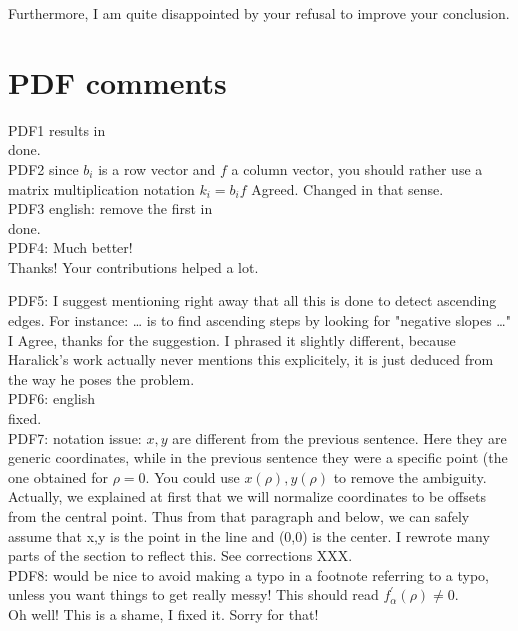 \documentclass[a4paper,10pt]{report}
\begin{document}
\que Furthermore, I am quite disappointed by your refusal to improve your
conclusion.\\

\section{PDF comments}

\que PDF1 results in\\
\ans done.\\

\que PDF2  since $b_i$ is a row vector and $f$ a column vector, you should rather use a matrix multiplication notation
$k_i=b_i f$
\ans Agreed. Changed in that sense.\\

\que PDF3 english: remove the first in\\
\ans done.\\

\que PDF4: Much better!\\
\ans Thanks! Your contributions helped a lot.

\que PDF5: I suggest mentioning right away that all this is done to detect ascending edges. For instance: … is to find ascending steps by looking for "negative slopes …"\\
\ans I Agree, thanks for the suggestion. I phrased it slightly different, because Haralick's work actually never mentions this explicitely, it is just deduced from the way he poses the problem.\\

\que PDF6: english\\
\ans fixed.\\

\que PDF7: notation issue: $x,y$ are different from the previous sentence. Here they are generic coordinates, while in the previous sentence they were a specific point (the one obtained for $\rho=0$. You could use $x(\rho),y(\rho)$ to remove the ambiguity.\\
\ans Actually, we explained at first that we will normalize coordinates to be offsets from the central point. Thus from that paragraph and below, we can safely assume that x,y is the point in the line and (0,0) is the center. I rewrote many parts of the section to reflect this. See corrections XXX.\\

\que PDF8:  would be nice to avoid making a typo in a footnote referring to a typo, unless you want things to get really messy! This should read $f_\alpha^{'}(\rho)\neq 0$.\\
\ans Oh well! This is a shame, I fixed it. Sorry for that!\\
\end{document}

